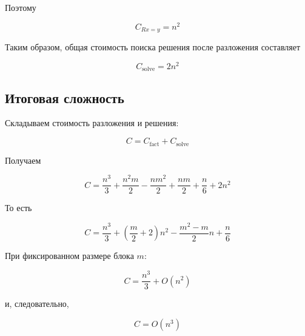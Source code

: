 \documentclass[a4paper,12pt]{article}
\begin{document}
Поэтому

$$
C_{Rx=y}=n^2
$$

Таким образом, общая стоимость поиска решения после разложения составляет

$$
C_{\text{solve}}
=
2n^2
$$

\subsection{Итоговая сложность}

Складываем стоимость разложения и решения:

$$
C
=
C_{\text{fact}}
+
C_{\text{solve}}
$$

Получаем

$$
C
=
\frac{n^3}{3}
+
\frac{n^2m}{2}
-
\frac{nm^2}{2}
+
\frac{nm}{2}
+
\frac{n}{6}
+
2n^2
$$

То есть

$$
\boxed{
  C
  =
  \frac{n^3}{3}
  +
  \left(\frac{m}{2}+2\right)n^2
  -
  \frac{m^2-m}{2}n
  +
  \frac{n}{6}
}
$$

При фиксированном размере блока \(m\):

$$
\boxed{
  C
  =
  \frac{n^3}{3}
  +
  O(n^2)
}
$$

и, следовательно,

$$
\boxed{
  C=O(n^3)
}
$$
\end{document}
